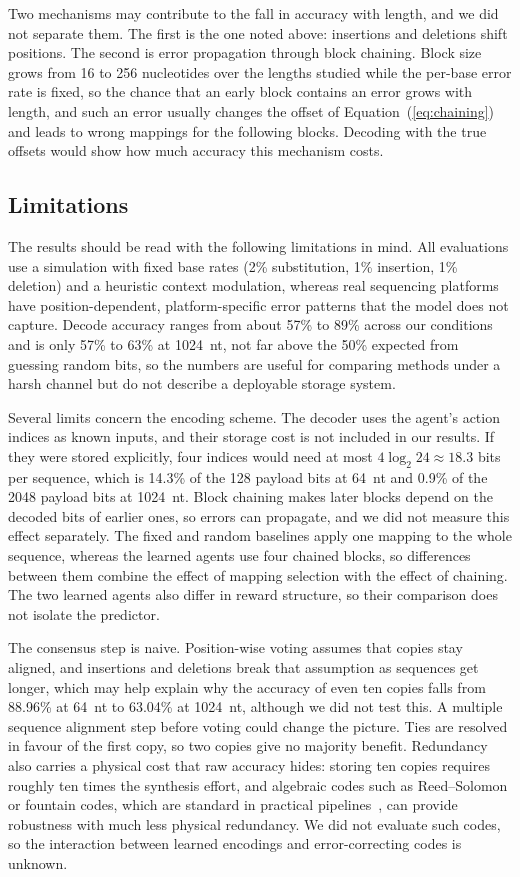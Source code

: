\documentclass[entropy,article,submit,moreauthors]{Definitions/mdpi}
\begin{document}
Two mechanisms may contribute to the fall in accuracy with length, and we did not separate them. The first is the one noted above: insertions and deletions shift positions. The second is error propagation through block chaining. Block size grows from 16 to 256 nucleotides over the lengths studied while the per-base error rate is fixed, so the chance that an early block contains an error grows with length, and such an error usually changes the offset of Equation~(\ref{eq:chaining}) and leads to wrong mappings for the following blocks. Decoding with the true offsets would show how much accuracy this mechanism costs.

\subsection{Limitations}
\label{sec:limitations}

The results should be read with the following limitations in mind. All evaluations use a simulation with fixed base rates (2\% substitution, 1\% insertion, 1\% deletion) and a heuristic context modulation, whereas real sequencing platforms have position-dependent, platform-specific error patterns that the model does not capture. Decode accuracy ranges from about 57\% to 89\% across our conditions and is only 57\% to 63\% at 1024~nt, not far above the 50\% expected from guessing random bits, so the numbers are useful for comparing methods under a harsh channel but do not describe a deployable storage system.

Several limits concern the encoding scheme. The decoder uses the agent's action indices as known inputs, and their storage cost is not included in our results. If they were stored explicitly, four indices would need at most $4\log_2 24 \approx 18.3$ bits per sequence, which is 14.3\% of the 128 payload bits at 64~nt and 0.9\% of the 2048 payload bits at 1024~nt. Block chaining makes later blocks depend on the decoded bits of earlier ones, so errors can propagate, and we did not measure this effect separately. The fixed and random baselines apply one mapping to the whole sequence, whereas the learned agents use four chained blocks, so differences between them combine the effect of mapping selection with the effect of chaining. The two learned agents also differ in reward structure, so their comparison does not isolate the predictor.

The consensus step is naive. Position-wise voting assumes that copies stay aligned, and insertions and deletions break that assumption as sequences get longer, which may help explain why the accuracy of even ten copies falls from 88.96\% at 64~nt to 63.04\% at 1024~nt, although we did not test this. A multiple sequence alignment step before voting could change the picture. Ties are resolved in favour of the first copy, so two copies give no majority benefit. Redundancy also carries a physical cost that raw accuracy hides: storing ten copies requires roughly ten times the synthesis effort, and algebraic codes such as Reed--Solomon or fountain codes, which are standard in practical pipelines~\cite{erlich2017}, can provide robustness with much less physical redundancy. We did not evaluate such codes, so the interaction between learned encodings and error-correcting codes is unknown.
\end{document}
